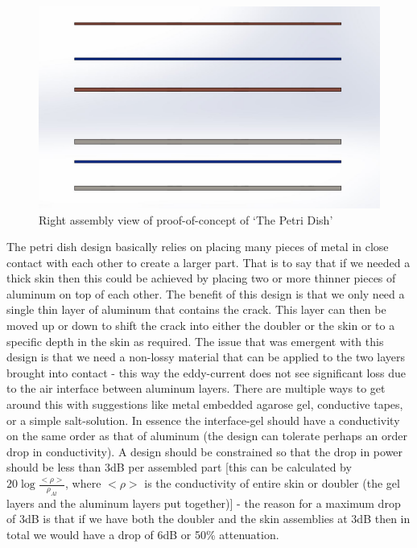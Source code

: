 \documentclass[12pt]{article}
\begin{document}
\begin{figure}[h!]
  \centering
  	\includegraphics[width=\textwidth]{Petri_left}
  \caption{Right assembly view of proof-of-concept of `The Petri Dish'}
  \label{fig:petri_left}
\end{figure}

The petri dish design basically relies on placing many pieces of metal in close contact with each other to create a larger part. That is to say that if we needed a thick skin then this could be achieved by placing two or more thinner pieces of aluminum on top of each other. The benefit of this design is that we only need a single thin layer of aluminum that contains the crack. This layer can then be moved up or down to shift the crack into either the doubler or the skin or to a specific depth in the skin as required. The issue that was emergent with this design is that we need a non-lossy material that can be applied to the two layers brought into contact - this way the eddy-current does not see significant loss due to the air interface between aluminum layers. There are multiple ways to get around this with suggestions like metal embedded agarose gel, conductive tapes, or a simple salt-solution. In essence the interface-gel should have a conductivity on the same order as that of aluminum (the design can tolerate perhaps an order drop in conductivity). A design should be constrained so that the drop in power should be less than 3dB per assembled part [this can be calculated by $20 \log{\frac{<\rho>}{\rho_{Al}}}$, where $<\rho>$ is the conductivity of entire skin or doubler (the gel layers and the aluminum layers put together)] - the reason for a maximum drop of 3dB is that if we have both the doubler and the skin assemblies at 3dB then in total we would have a drop of 6dB or 50\% attenuation. 
\end{document}
